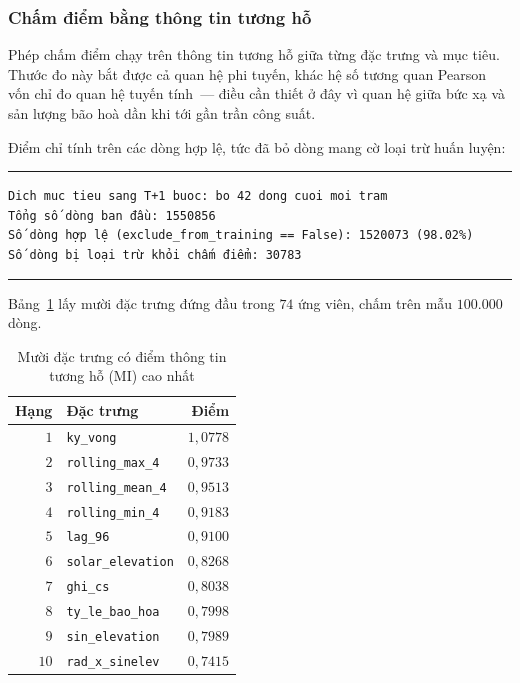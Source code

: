 \documentclass[12pt, a4paper]{report}
\begin{document}
\subsubsection{Chấm điểm bằng thông tin tương hỗ}

Phép chấm điểm chạy trên thông tin tương hỗ giữa từng đặc trưng và mục tiêu. Thước đo
này bắt được cả quan hệ phi tuyến, khác hệ số tương quan Pearson vốn chỉ đo quan hệ tuyến
tính~--- điều cần thiết ở đây vì quan hệ giữa bức xạ và sản lượng bão hoà dần khi tới gần trần công
suất.

Điểm chỉ tính trên các dòng hợp lệ, tức đã bỏ dòng mang cờ loại trừ huấn luyện:

\begingroup
\par\vspace{6pt}\hrule\vspace{4pt}
\small\renewcommand{\baselinestretch}{1.0}\selectfont
\begin{verbatim}
Dich muc tieu sang T+1 buoc: bo 42 dong cuoi moi tram
Tổng số dòng ban đầu: 1550856
Số dòng hợp lệ (exclude_from_training == False): 1520073 (98.02%)
Số dòng bị loại trừ khỏi chấm điểm: 30783
\end{verbatim}
\vspace{2pt}\hrule\par\vspace{6pt}
\endgroup

Bảng~\ref{tab:mi} lấy mười đặc trưng đứng đầu trong $74$ ứng viên, chấm trên mẫu $100.000$ dòng.

\begin{table}[htbp]
\centering
\caption{Mười đặc trưng có điểm thông tin tương hỗ (MI) cao nhất}
\label{tab:mi}
\small
\begin{tabular}{r l r}
\toprule
\textbf{Hạng} & \textbf{Đặc trưng} & \textbf{Điểm} \\
\midrule
$1$  & \texttt{ky\_vong}         & $1{,}0778$ \\
$2$  & \texttt{rolling\_max\_4}   & $0{,}9733$ \\
$3$  & \texttt{rolling\_mean\_4}  & $0{,}9513$ \\
$4$  & \texttt{rolling\_min\_4}   & $0{,}9183$ \\
$5$  & \texttt{lag\_96}          & $0{,}9100$ \\
$6$  & \texttt{solar\_elevation} & $0{,}8268$ \\
$7$  & \texttt{ghi\_cs}          & $0{,}8038$ \\
$8$  & \texttt{ty\_le\_bao\_hoa}   & $0{,}7998$ \\
$9$  & \texttt{sin\_elevation}   & $0{,}7989$ \\
$10$ & \texttt{rad\_x\_sinelev}   & $0{,}7415$ \\
\bottomrule
\end{tabular}


\end{table}
\end{document}
